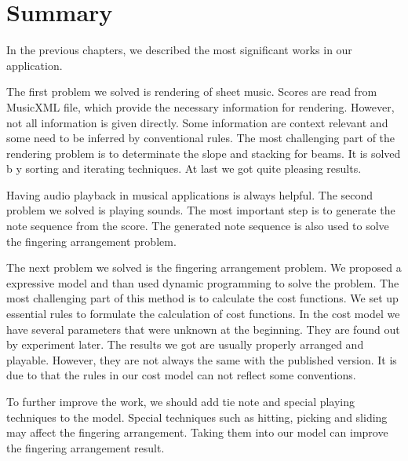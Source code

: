 \chapter{Summary}

\label{Chapter:Summary}

In the previous chapters, we described the most significant works in our application.

The first problem we solved is
rendering of sheet music. Scores are read from MusicXML file, which provide the necessary information for rendering.
However, not all information is given directly. Some information are context relevant and some need to be inferred by
conventional rules. 
The most challenging part of the rendering problem is to determinate the slope and stacking for beams. It is solved b
y sorting and iterating techniques. At last we got quite pleasing results.

Having audio playback in musical applications is always helpful.
The second problem we solved is playing sounds. The most important step is to generate the note sequence from the score.
The generated note sequence is also used to solve the fingering arrangement problem. 

The next problem we solved is the fingering arrangement problem. We proposed a expressive model and than used dynamic programming 
to solve the problem. The most challenging part of this method is to calculate the cost functions. We set up essential rules to 
formulate the calculation of cost functions. In the cost model we have several parameters that were unknown at the beginning. They 
are found out by experiment later. The results we got are usually properly arranged and playable. However, they are not always the  
same with the published version. It is due to that the rules in our cost model can not reflect some conventions.

To further improve the work, we should add tie note and special playing techniques to the model.
Special techniques such as hitting, picking and sliding may affect the fingering arrangement. Taking them into our model can improve
the fingering arrangement result.
